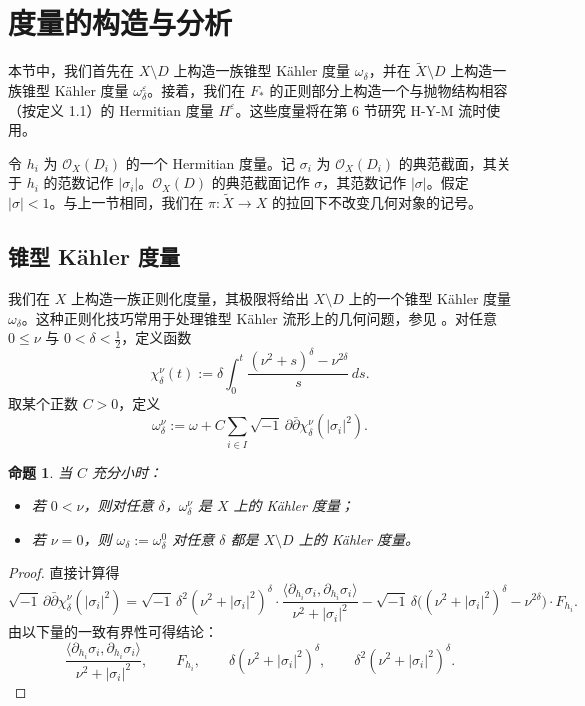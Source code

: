 \documentclass[12pt,a4paper]{article}
\newtheorem{proposition}[theorem]{命题}
\begin{document}
\section{度量的构造与分析}

本节中，我们首先在 \(X\setminus D\) 上构造一族锥型 Kähler 度量 \(\omega_\delta\)，并在 \(\widetilde X\setminus D\) 上构造一族锥型 Kähler 度量 \(\omega^\varepsilon_\delta\)。接着，我们在 \(F_*\) 的正则部分上构造一个与抛物结构相容（按定义 1.1）的 Hermitian 度量 \(H^\varepsilon\)。这些度量将在第 6 节研究 H-Y-M 流时使用。

令 \(h_i\) 为 \( \mathcal O_X(D_i)\) 的一个 Hermitian 度量。记 \(\sigma_i\) 为 \( \mathcal O_X(D_i)\) 的典范截面，其关于 \(h_i\) 的范数记作 \(|\sigma_i|\)。\( \mathcal O_X(D)\) 的典范截面记作 \(\sigma\)，其范数记作 \(|\sigma|\)。假定 \(|\sigma|<1\)。与上一节相同，我们在 \(\pi:\widetilde X\to X\) 的拉回下不改变几何对象的记号。

\subsection{锥型 Kähler 度量}

我们在 \(X\) 上构造一族正则化度量，其极限将给出 \(X\setminus D\) 上的一个锥型 Kähler 度量 \(\omega_\delta\)。这种正则化技巧常用于处理锥型 Kähler 流形上的几何问题，参见 \cite{GuenanciaPaun}。对任意 \(0\le \nu\) 与 \(0<\delta<\frac12\)，定义函数
\[
\chi^\nu_\delta(t):=
\delta\int_0^t \frac{(\nu^2+s)^\delta-\nu^{2\delta}}{s}\,ds.
\]
取某个正数 \(C>0\)，定义
\[
\omega^\nu_\delta
:=
\omega
+
C\sum_{i\in I}\sqrt{-1}\,\partial\bar\partial \chi^\nu_\delta(|\sigma_i|^2).
\]

\begin{proposition}
当 \(C\) 充分小时：
\begin{itemize}
\item 若 \(0<\nu\)，则对任意 \(\delta\)，\(\omega^\nu_\delta\) 是 \(X\) 上的 Kähler 度量；
\item 若 \(\nu=0\)，则 \(\omega_\delta:=\omega^0_\delta\) 对任意 \(\delta\) 都是 \(X\setminus D\) 上的 Kähler 度量。
\end{itemize}
\end{proposition}

\begin{proof}
直接计算得
\[
\sqrt{-1}\,\partial\bar\partial \chi^\nu_\delta(|\sigma_i|^2)
=
\sqrt{-1}\,\delta^2(\nu^2+|\sigma_i|^2)^\delta\cdot
\frac{\langle \partial_{h_i}\sigma_i,\partial_{h_i}\sigma_i\rangle}{\nu^2+|\sigma_i|^2}
-
\sqrt{-1}\,\delta\bigl((\nu^2+|\sigma_i|^2)^\delta-\nu^{2\delta}\bigr)\cdot F_{h_i}.
\]
由以下量的一致有界性可得结论：
\[
\frac{\langle \partial_{h_i}\sigma_i,\partial_{h_i}\sigma_i\rangle}{\nu^2+|\sigma_i|^2},
\qquad
F_{h_i},
\qquad
\delta(\nu^2+|\sigma_i|^2)^\delta,
\qquad
\delta^2(\nu^2+|\sigma_i|^2)^\delta.
\]
\end{proof}
\end{document}
